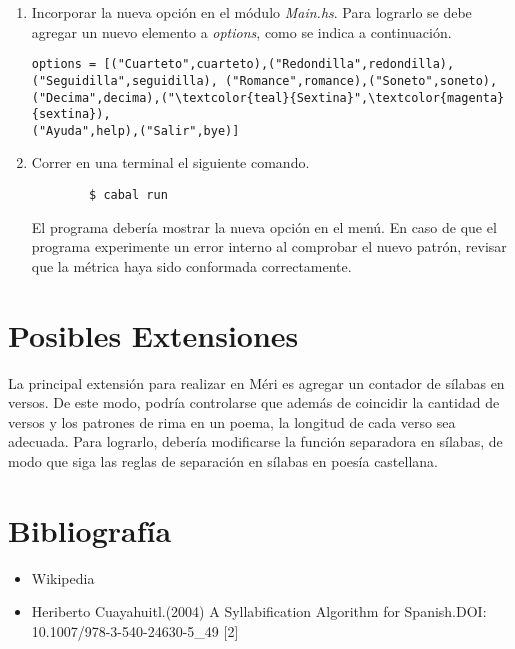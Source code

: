 \documentclass[12pt, a4paper]{article}
\begin{document}
\begin{enumerate}
	\item Incorporar la nueva opción en el módulo \textit{Main.hs}. Para lograrlo se debe agregar un nuevo elemento a \textit{options}, como se indica a continuación.

\begin{Verbatim}[commandchars=\\\{\}]
options = [("Cuarteto",cuarteto),("Redondilla",redondilla), 
("Seguidilla",seguidilla), ("Romance",romance),("Soneto",soneto),
("Decima",decima),("\textcolor{teal}{Sextina}",\textcolor{magenta}{sextina}),
("Ayuda",help),("Salir",bye)]
\end{Verbatim}	
	
	\item Correr en una terminal el siguiente comando.
	\begin{verbatim}
	    $ cabal run
	\end{verbatim}
	El programa debería mostrar la nueva opción en el menú. En caso de que el programa experimente un error interno al comprobar el nuevo patrón, revisar que la métrica haya sido conformada correctamente.
\end{enumerate}


\section*{Posibles Extensiones} 
La principal extensión para realizar en Méri es agregar un contador de sílabas en versos. De este modo, podría controlarse que además de coincidir la cantidad de versos y los patrones de rima en un poema, la longitud de cada verso sea adecuada. Para lograrlo, debería modificarse la función separadora en sílabas, de modo que siga las reglas de separación en sílabas en poesía castellana.

\section*{Bibliografía}
 \begin{itemize}
 	\item Wikipedia
 	\item Heriberto Cuayahuitl.(2004) A Syllabification Algorithm for Spanish.DOI: 10.1007/978-3-540-24630-5\_49 [2]
 \end{itemize}
\end{document}
